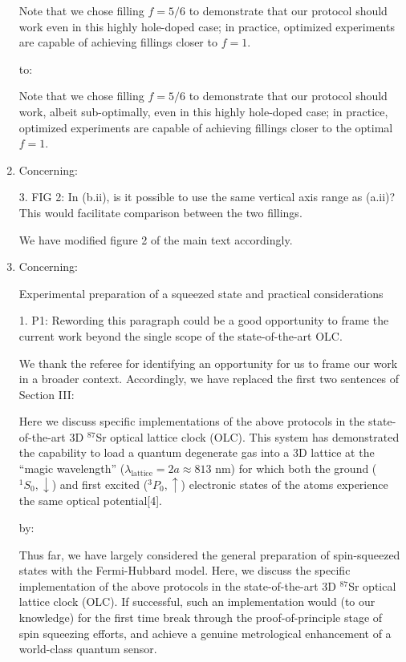 \documentclass[preprint,superscriptaddress]{revtex4-2}
\renewcommand{\t}{\text} %
\newcommand{\up}{\uparrow}
\newcommand{\dn}{\downarrow}
\newcommand{\blue}[1]{{\color{blue} #1}}
\newcommand{\red}[1]{{\color{red} #1}}
\newcommand{\green}[1]{{\color{ForestGreen} #1}}
\begin{document}
\begin{enumerate}
  \red{Note that we chose filling $f=5/6$ to demonstrate that our
    protocol should work even in this highly hole-doped case; in
    practice, optimized experiments are capable of achieving fillings
    closer to $f=1$.}

  to:

  \green{Note that we chose filling $f=5/6$ to demonstrate that our
    protocol should work, albeit sub-optimally, even in this highly
    hole-doped case; in practice, optimized experiments are capable of
    achieving fillings closer to the optimal $f=1$.}

\item Concerning:

  \blue{3. FIG 2: In (b.ii), is it possible to use the same vertical
    axis range as (a.ii)? This would facilitate comparison between the
    two fillings.}

  We have modified figure 2 of the main text accordingly.

\item Concerning:

  \blue{Experimental preparation of a squeezed state and practical
    considerations}

  \blue{1. P1: Rewording this paragraph could be a good opportunity to
    frame the current work beyond the single scope of the
    state-of-the-art OLC.}

  We thank the referee for identifying an opportunity for us to frame
  our work in a broader context.  Accordingly, we have replaced the
  first two sentences of Section III:

  \red{Here we discuss specific implementations of the above protocols
    in the state-of-the-art 3D $^{87}$Sr optical lattice clock (OLC).
    This system has demonstrated the capability to load a quantum
    degenerate gas into a 3D lattice at the ``magic wavelength''
    ($\lambda_{\t{lattice}}=2a\approx813$ nm) for which both the
    ground ($^1S_0,\dn$) and first excited ($^3P_0,\up$) electronic
    states of the atoms experience the same optical potential[4].}

  by:

  \green{Thus far, we have largely considered the general preparation
    of spin-squeezed states with the Fermi-Hubbard model.  Here, we
    discuss the specific implementation of the above protocols in the
    state-of-the-art 3D $^{87}$Sr optical lattice clock (OLC).  If
    successful, such an implementation would (to our knowledge) for
    the first time break through the proof-of-principle stage of spin
    squeezing efforts, and achieve a genuine metrological enhancement
    of a world-class quantum sensor.}


\end{enumerate}
\end{document}
